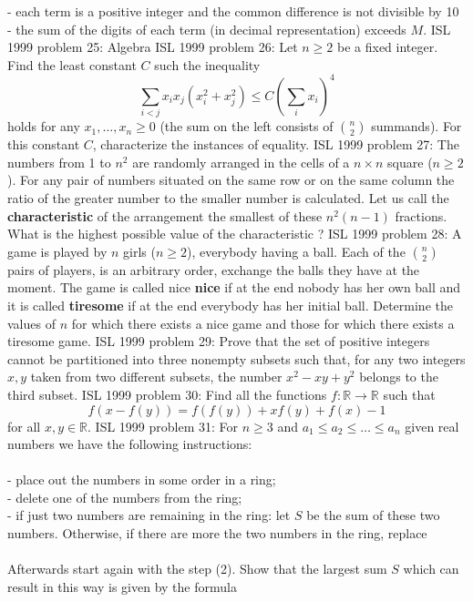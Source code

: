 - each term is a positive integer and the common difference is not divisible by 10 \\
-  the sum of the digits of each term (in decimal representation) exceeds $M$. 
ISL 1999 problem 25:  Algebra 
ISL 1999 problem 26:  Let $n \geq 2$ be a fixed integer. Find the least constant $C$ such the inequality
\[ \sum_{i<j} x_ix_j \left(x^2_i+x^2_j \right) \leq C
\left(\sum_ix_i \right)^4 \]
holds for any $x_1, \ldots ,x_n \geq 0$ (the sum on the left consists of $\binom{n}{2}$ summands). For this constant $C$, characterize the instances of equality. 
ISL 1999 problem 27:  The numbers from 1 to $n^2$  are randomly arranged in the cells of a $n \times n$ square ($n \geq 2$). For any pair of numbers situated on the same row or on the same column the ratio of the greater number to the smaller number is calculated.  Let us call the \textbf{characteristic} of the arrangement the smallest of these $n^2\left(n-1\right)$ fractions. What is the highest possible value of the characteristic ? 
ISL 1999 problem 28:  A game is played by $n$ girls ($n \geq 2$), everybody having a ball. Each of the $\binom{n}{2}$ pairs of players, is an arbitrary order, exchange the balls they have at the moment. The game is called nice \textbf{nice} if at the end nobody has her own ball and it is called \textbf{tiresome} if at the end everybody has her initial ball. Determine the values of $n$ for which there exists a nice game and those for which there exists a tiresome game. 
ISL 1999 problem 29:  Prove that the set of positive integers cannot be partitioned into three nonempty subsets such that, for any two integers $x,y$ taken from two different subsets, the number $x^2-xy+y^2$ belongs to the third subset. 
ISL 1999 problem 30:  Find all the functions $f: \mathbb{R} \to\mathbb{R}$ such that
\[ f(x-f(y))=f(f(y))+xf(y)+f(x)-1 \]
for all $x,y \in \mathbb{R} $. 
ISL 1999 problem 31:  For $n \geq 3$ and $a_1 \leq a_2 \leq \ldots \leq a_n$ given real numbers we have the following instructions: \\\\
- place out the numbers in some order in a ring; \\
- delete one of the numbers from the ring; \\
- if just two numbers are remaining in the ring: let $S$ be the sum of these two numbers. Otherwise, if there are more the two numbers in the ring, replace \\\\
Afterwards start again with the step (2). Show that the largest sum $S$ which can result in this way is given by the formula
